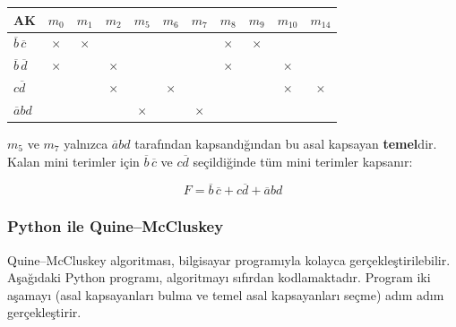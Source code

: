 \begin{ornek}[B.8]
\begin{center}
\small
\begin{tabular}{l|cccccccccc}
\toprule
\textbf{AK} & $m_0$ & $m_1$ & $m_2$ & $m_5$ & $m_6$ & $m_7$ & $m_8$ & $m_9$ & $m_{10}$ & $m_{14}$ \\
\midrule
$\overline{b}\,\overline{c}$ & $\times$ & $\times$ & & & & & $\times$ & $\times$ & & \\
$\overline{b}\,\overline{d}$ & $\times$ & & $\times$ & & & & $\times$ & & $\times$ & \\
$c\overline{d}$ & & & $\times$ & & $\times$ & & & & $\times$ & $\times$ \\
$\overline{a}bd$ & & & & $\times$ & & $\times$ & & & & \\
\bottomrule
\end{tabular}
\end{center}

$m_5$ ve $m_7$ yalnızca $\overline{a}bd$ tarafından kapsandığından bu asal kapsayan \textbf{temel}dir. Kalan mini terimler için $\overline{b}\,\overline{c}$ ve $c\overline{d}$ seçildiğinde tüm mini terimler kapsanır:

\[
F = \overline{b}\,\overline{c} + c\overline{d} + \overline{a}bd
\]
\end{ornek}

\subsubsection{Python ile Quine--McCluskey}
Quine--McCluskey algoritması, bilgisayar programıyla kolayca gerçekleştirilebilir. Aşağıdaki Python programı, algoritmayı sıfırdan kodlamaktadır. Program iki aşamayı (asal kapsayanları bulma ve temel asal kapsayanları seçme) adım adım gerçekleştirir.

